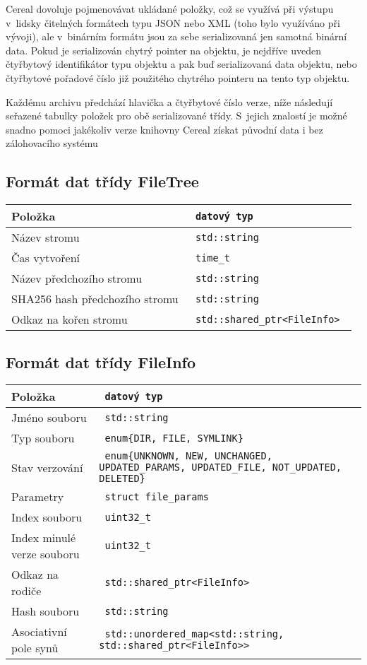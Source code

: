 Cereal dovoluje pojmenovávat ukládané položky, což se využívá při výstupu
v~lidsky čitelných formátech typu JSON nebo XML (toho bylo využíváno při vývoji),
ale v~binárním formátu jsou za sebe serializovaná jen samotná binární data. Pokud
je serializován chytrý pointer na objektu, je nejdříve uveden čtyřbytový
identifikátor typu objektu a pak buď serializovaná data objektu, nebo čtyřbytové
pořadové číslo již použitého chytrého pointeru na tento typ objektu.

Každému archivu předchází hlavička a čtyřbytové číslo verze, níže následují
seřazené tabulky položek pro obě serializované třídy. S~jejich znalostí je možné
snadno pomoci jakékoliv verze knihovny Cereal získat původní data i bez
zálohovacího systému

\subsection{Formát dat třídy FileTree}

\begin{tabular}{l >{\tt}l}
\bf Položka & \bf datový typ \\
\hline
Název stromu & std::string \\
Čas vytvoření & time\_t \\
Název předchozího stromu & std::string \\
SHA256 hash předchozího stromu & std::string \\
Odkaz na kořen stromu & std::shared\_ptr<FileInfo> \\
\end{tabular}

\subsection{Formát dat třídy FileInfo}

\begin{tabular}{l >{\tt}p{7cm}}
\bf Položka & \bf datový typ \\
\hline
Jméno souboru & std::string \\
Typ souboru & enum\{DIR, FILE, SYMLINK\}\\
Stav verzování & enum\{UNKNOWN, NEW, UNCHANGED, UPDATED\_PARAMS, UPDATED\_FILE, NOT\_UPDATED, DELETED\} \\
Parametry & struct file\_params \\
Index souboru & uint32\_t \\
Index minulé verze souboru & uint32\_t \\
Odkaz na rodiče & std::shared\_ptr<FileInfo> \\
Hash souboru & std::string \\
Asociativní pole synů & std::unordered\_map<std::string, std::shared\_ptr<FileInfo>\relax> \\
\end{tabular}

